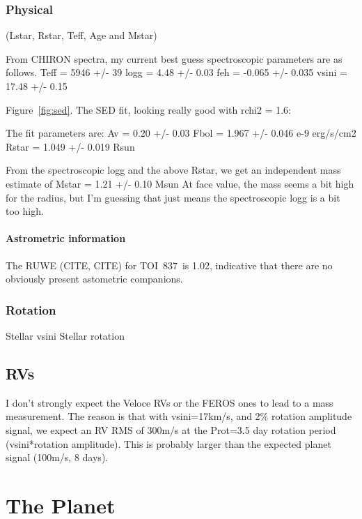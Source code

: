 \documentclass[12pt,twocolumn,tighten]{aastex62}
\newcommand{\tn}{TOI~837} %
\begin{document}
\subsubsection{Physical}
 (Lstar, Rstar, Teff, Age and Mstar)

From CHIRON spectra, my current best guess spectroscopic parameters
 are as follows.
 Teff = 5946 +/- 39
 logg = 4.48 +/- 0.03
 feh = -0.065 +/- 0.035
 vsini = 17.48 +/- 0.15

Figure~\ref{fig:sed}.
The SED fit, looking really good with rchi2 = 1.6: 

The fit parameters are: 
Av = 0.20 +/- 0.03
Fbol = 1.967 +/- 0.046 e-9 erg/s/cm2 
Rstar = 1.049 +/- 0.019 Rsun 

From the spectroscopic logg and the above Rstar, we get an independent
mass estimate of 
Mstar = 1.21 +/- 0.10 Msun 
At face value, the mass seems a bit high for the radius, but I'm
guessing that just means the spectroscopic logg is a bit too high. 


\paragraph{Astrometric information}
The RUWE (CITE, CITE) for \tn\ is 1.02, indicative that there are no
obviously present astometric companions.


\subsubsection{Rotation}
Stellar vsini
Stellar rotation

\subsection{RVs}
I don't strongly expect the Veloce RVs or the FEROS ones to lead to a
mass measurement. The reason is that with vsini=17km/s, and 2\%
rotation amplitude signal, we expect an RV RMS of 300m/s at the
Prot=3.5 day rotation period (vsini*rotation amplitude). This is
probably larger than the expected planet signal (100m/s, 8 days).



\section{The Planet}
\label{sec:planet}
\end{document}

